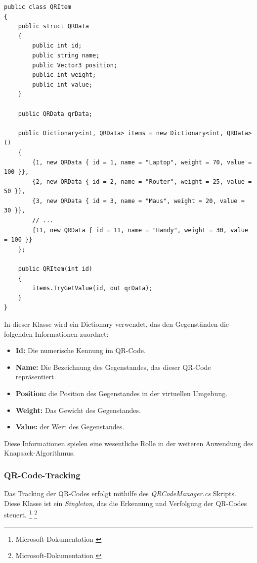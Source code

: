 \begin{lstlisting}[style=csharp, caption={Codeabschnitt von QRItem Klasse}, label=code:update]
public class QRItem
{
    public struct QRData
    {
        public int id;
        public string name;
        public Vector3 position;
        public int weight;
        public int value;
    }

    public QRData qrData;

    public Dictionary<int, QRData> items = new Dictionary<int, QRData>()
    {
        {1, new QRData { id = 1, name = "Laptop", weight = 70, value = 100 }},
        {2, new QRData { id = 2, name = "Router", weight = 25, value = 50 }},
        {3, new QRData { id = 3, name = "Maus", weight = 20, value = 30 }},
        // ...
        {11, new QRData { id = 11, name = "Handy", weight = 30, value = 100 }}
    };

    public QRItem(int id)
    {
        items.TryGetValue(id, out qrData);
    }
}
\end{lstlisting}

In dieser Klasse wird ein Dictionary verwendet, das den Gegenständen die folgenden Informationen zuordnet:

\begin{itemize}
    \item \textbf{Id:} Die numerische Kennung im QR-Code.
    \item \textbf{Name:} Die Bezeichnung des Gegenstandes, das dieser QR-Code repräsentiert.
    \item \textbf{Position:} die Position des Gegenstandes in der virtuellen Umgebung.
    \item \textbf{Weight:} Das Gewicht des Gegenstandes.
    \item \textbf{Value:} der Wert des Gegenstandes.
\end{itemize}

Diese Informationen spielen eine wesentliche Rolle in der weiteren Anwendung des Knapsack-Algorithmus.

\subsubsection{QR-Code-Tracking}
Das Tracking der QR-Codes erfolgt mithilfe des \textit{QRCodeManager.cs} Skripts. Diese Klasse ist ein \textit{Singleton}, das
die Erkennung und Verfolgung der QR-Codes steuert. \footnote{Microsoft-Dokumentation \cite{Singleton}} \footnote{Microsoft-Dokumentation \cite{QR-Code-Tracking}}

